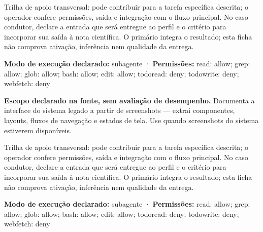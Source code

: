 \begin{funcao}
Trilha de apoio transversal: pode contribuir para a tarefa específica descrita; o operador confere permissões, saída e integração com o fluxo principal. No caso condutor, declare a entrada que será entregue ao perfil e o critério para incorporar sua saída à nota científica. O primário integra o resultado; esta ficha não comprova ativação, inferência nem qualidade da entrega.
\end{funcao}

\begin{arquitetura}
\textbf{Modo de execução declarado:} subagente · \textbf{Permissões:} read: allow; grep: allow; glob: allow; bash: allow; edit: allow; todoread: deny; todowrite: deny; webfetch: deny
\end{arquitetura}


\begin{descricao}
\textbf{Escopo declarado na fonte, sem avaliação de desempenho.}
Documenta a interface do sistema legado a partir de screenshots — extrai componentes, layouts, fluxos de navegação e estados de tela. Use quando screenshots do sistema estiverem disponíveis.
\end{descricao}

\begin{funcao}
Trilha de apoio transversal: pode contribuir para a tarefa específica descrita; o operador confere permissões, saída e integração com o fluxo principal. No caso condutor, declare a entrada que será entregue ao perfil e o critério para incorporar sua saída à nota científica. O primário integra o resultado; esta ficha não comprova ativação, inferência nem qualidade da entrega.
\end{funcao}

\begin{arquitetura}
\textbf{Modo de execução declarado:} subagente · \textbf{Permissões:} read: allow; grep: allow; glob: allow; bash: allow; edit: allow; todoread: deny; todowrite: deny; webfetch: deny
\end{arquitetura}


